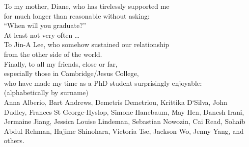 
\begin{dedication}
To my mother, Diane, who has tirelessly supported me\\
for much longer than reasonable without asking:\\
``When will you graduate?''\\
At least not very often \ldots\\
\vspace{0.33\textheight minus 10ex}
To Jin-A Lee, who somehow sustained our relationship\\
from the other side of the world.\\
\vspace{0.11\textheight minus 10ex}
Finally, to all my friends, close or far,\\
especially those in Cambridge/Jesus College,\\
who have made my time as a PhD student surprisingly enjoyable:\\
\vspace{1em}
{\small(alphabetically by surname)}\\
\vspace{0.5em}
Anna Alberio,
Bart Andrews,
Demetris Demetriou,
Krittika D`Silva,
John Dudley,
Frances St George-Hyslop,
Simone Hanebaum,
May Hen,
Danesh Irani,
Jermaine Jiang,
Jessica Louise Lindeman,
Sebastian Nowozin,
Cai Read,
Sohaib Abdul Rehman,
Hajime Shinohara,
Victoria Tse,
Jackson Wo,
Jenny Yang,
and others.
\end{dedication}